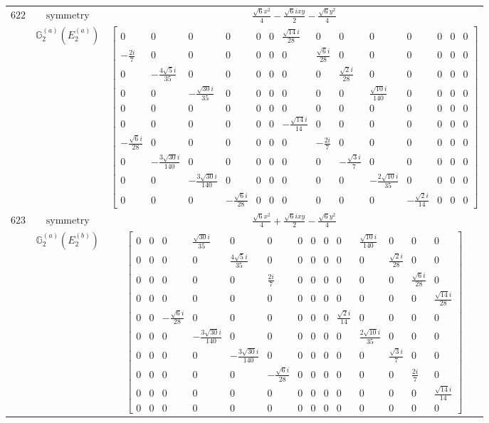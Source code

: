\documentclass[fleqn,8pt,landscape]{jsarticle}
\begin{document}
\begin{longtable}{ccc}
$ 622 $ & $ \text{symmetry} $ & $ \frac{\sqrt{6} x^{2}}{4} - \frac{\sqrt{6} i x y}{2} - \frac{\sqrt{6} y^{2}}{4} $ \\
$  $ & $ \mathbb{G}_{2}^{(a)}(E_{2}^{(a)}) $ & $ \begin{bmatrix} 0 & 0 & 0 & 0 & 0 & 0 & \frac{\sqrt{14} i}{28} & 0 & 0 & 0 & 0 & 0 & 0 & 0 \\ - \frac{2 i}{7} & 0 & 0 & 0 & 0 & 0 & 0 & \frac{\sqrt{6} i}{28} & 0 & 0 & 0 & 0 & 0 & 0 \\ 0 & - \frac{4 \sqrt{5} i}{35} & 0 & 0 & 0 & 0 & 0 & 0 & \frac{\sqrt{2} i}{28} & 0 & 0 & 0 & 0 & 0 \\ 0 & 0 & - \frac{\sqrt{30} i}{35} & 0 & 0 & 0 & 0 & 0 & 0 & \frac{\sqrt{10} i}{140} & 0 & 0 & 0 & 0 \\ 0 & 0 & 0 & 0 & 0 & 0 & 0 & 0 & 0 & 0 & 0 & 0 & 0 & 0 \\ 0 & 0 & 0 & 0 & 0 & 0 & - \frac{\sqrt{14} i}{14} & 0 & 0 & 0 & 0 & 0 & 0 & 0 \\ - \frac{\sqrt{6} i}{28} & 0 & 0 & 0 & 0 & 0 & 0 & - \frac{2 i}{7} & 0 & 0 & 0 & 0 & 0 & 0 \\ 0 & - \frac{3 \sqrt{30} i}{140} & 0 & 0 & 0 & 0 & 0 & 0 & - \frac{\sqrt{3} i}{7} & 0 & 0 & 0 & 0 & 0 \\ 0 & 0 & - \frac{3 \sqrt{30} i}{140} & 0 & 0 & 0 & 0 & 0 & 0 & - \frac{2 \sqrt{10} i}{35} & 0 & 0 & 0 & 0 \\ 0 & 0 & 0 & - \frac{\sqrt{6} i}{28} & 0 & 0 & 0 & 0 & 0 & 0 & - \frac{\sqrt{2} i}{14} & 0 & 0 & 0 \end{bmatrix} $ \\ \hline
$ 623 $ & $ \text{symmetry} $ & $ \frac{\sqrt{6} x^{2}}{4} + \frac{\sqrt{6} i x y}{2} - \frac{\sqrt{6} y^{2}}{4} $ \\
$  $ & $ \mathbb{G}_{2}^{(a)}(E_{2}^{(b)}) $ & $ \begin{bmatrix} 0 & 0 & 0 & \frac{\sqrt{30} i}{35} & 0 & 0 & 0 & 0 & 0 & 0 & \frac{\sqrt{10} i}{140} & 0 & 0 & 0 \\ 0 & 0 & 0 & 0 & \frac{4 \sqrt{5} i}{35} & 0 & 0 & 0 & 0 & 0 & 0 & \frac{\sqrt{2} i}{28} & 0 & 0 \\ 0 & 0 & 0 & 0 & 0 & \frac{2 i}{7} & 0 & 0 & 0 & 0 & 0 & 0 & \frac{\sqrt{6} i}{28} & 0 \\ 0 & 0 & 0 & 0 & 0 & 0 & 0 & 0 & 0 & 0 & 0 & 0 & 0 & \frac{\sqrt{14} i}{28} \\ 0 & 0 & - \frac{\sqrt{6} i}{28} & 0 & 0 & 0 & 0 & 0 & 0 & \frac{\sqrt{2} i}{14} & 0 & 0 & 0 & 0 \\ 0 & 0 & 0 & - \frac{3 \sqrt{30} i}{140} & 0 & 0 & 0 & 0 & 0 & 0 & \frac{2 \sqrt{10} i}{35} & 0 & 0 & 0 \\ 0 & 0 & 0 & 0 & - \frac{3 \sqrt{30} i}{140} & 0 & 0 & 0 & 0 & 0 & 0 & \frac{\sqrt{3} i}{7} & 0 & 0 \\ 0 & 0 & 0 & 0 & 0 & - \frac{\sqrt{6} i}{28} & 0 & 0 & 0 & 0 & 0 & 0 & \frac{2 i}{7} & 0 \\ 0 & 0 & 0 & 0 & 0 & 0 & 0 & 0 & 0 & 0 & 0 & 0 & 0 & \frac{\sqrt{14} i}{14} \\ 0 & 0 & 0 & 0 & 0 & 0 & 0 & 0 & 0 & 0 & 0 & 0 & 0 & 0 \end{bmatrix} $ \\ \hline

\end{longtable}
\end{document}
